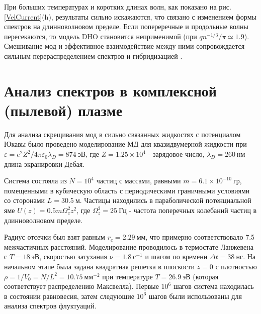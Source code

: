 При больших температурах и коротких
длинах волн, как показано на рис. \ref{VelCurrent}(h), результаты сильно искажаются, что связано с
изменением формы спектров на длинноволновом пределе. Если попереречные и продольные волны пересекаются, то модель DHO становится неприменимой (при $qn^{-1/3}/ \pi \simeq 1.9$). Смешивание мод и эффективное взаимодействие между ними сопровождается сильным перераспределением спектров и гибридизацией \cite{101103, 112101}.






\section{Анализ спектров в комплексной (пылевой) плазме}





Для анализа скрещивания мод в сильно связанных жидкостях с потенциалом Юкавы было проведено моделирование МД для квазидвумерной жидкости при  $\varepsilon = e^2 Z^2 /4\pi \varepsilon_0 \lambda_D = 874 ~\text{эВ}$, где $Z = 1.25 \times 10^4$ - зарядовое число, $\lambda_D  = 260~ \text{нм}$ - длина экранировки Дебая. 

Система состояла из $N = 10^4$ частиц с массами, равными $m = 6.1 \times 10^{-10}~ \text{гр}$, помещенными в кубическую область с периодическими граничными условиями со сторонами $L = 30.5~ \text{м}$. Частицы находились в параболической потенциальной яме $U(z)  = 0.5 m \Omega_z^2 z^2$, где $\Omega_z^2 = 25 ~\text{Гц}$ - частота поперечных колебаний частиц  в длинноволновом пределе. 



Радиус отсечки был взят равным $r_c = 2.29~ \text{мм}$, что примерно соответствовало 7.5 межчастичных расстояний. Моделирование проводилось в термостате Ланжевена с $T = 18~ \text{эВ}$, скоростью затухания $\nu = 1.8 ~\text{с}^{-1}$ и шагом по времени $\Delta t = 38~ \text{нс}$. На начальном этапе была задана квадратная решетка в плоскости $z = 0$ с плотностью $\rho = 1/V_0 = N/L^2 = 10.75~ \text{мм}^{-2}$ при температуре $T = 26.9~ \text{эВ}$ (которая соответствует распределению Максвелла). Первые $10^{6}$ шагов система находилась в состоянии равновесия, затем следующие $10^6$ шагов были использованы для анализа спектров флуктуаций.





